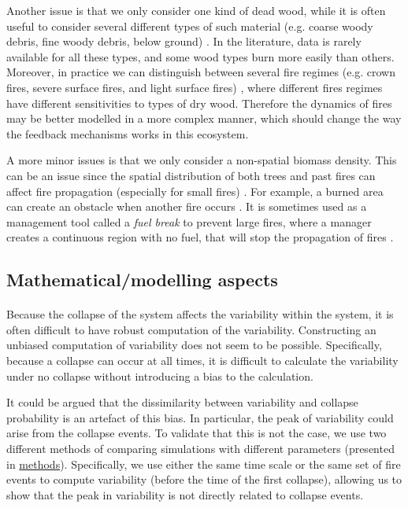 \documentclass{article}
\begin{document}
Another issue is that we only consider one kind of dead wood, while it is often useful to consider several different types of such material (e.g. coarse woody debris, fine woody debris, below ground) \citep{russell_quantifying_2015}. In the literature, data is rarely available for all these types, and some wood types burn more easily than others. Moreover, in practice we can distinguish between several fire regimes (e.g.  crown fires, severe surface fires, and light surface fires) \citep{reichle_fire_1981}, where different fires regimes have different sensitivities to types of dry wood. Therefore the dynamics of fires may be better modelled in a more complex manner, which should change the way the feedback mechanisms works in this ecosystem.

A more minor issues is that we only consider a non-spatial biomass density. This can be an issue since the spatial distribution of both trees and past fires can affect fire propagation (especially for small fires) \citep{beaty_spatial_2002}. For example, a burned area can create an obstacle when another fire occurs \citep{bergeron_natural_2002, ager_modeling_2007}. It is sometimes used as a management tool called a \textit{fuel break} to prevent large fires, where a manager creates a continuous region with no fuel, that will stop the propagation of fires \citep{syphard_comparing_2011, agee_use_2000}.



\subsection{Mathematical/modelling aspects}

\paragraph{}
Because the collapse of the system affects the variability within the system, it is often difficult to have robust computation of the variability. Constructing an unbiased computation of variability does not seem to be possible. Specifically, because a collapse can occur at all times, it is difficult to calculate the variability under no collapse without introducing a bias to the calculation.

It could be argued that the dissimilarity between variability and collapse probability is an artefact of this bias. In particular, the peak of variability could arise from the collapse events. To validate that this is not the case, we use two different methods of comparing simulations with different parameters (presented in \hyperref[same_fire]{methods}). Specifically, we use either the same time scale or the same set of fire events to compute variability (before the time of the first collapse), allowing us to show that the peak in variability is not directly related to collapse events. 
\end{document}
